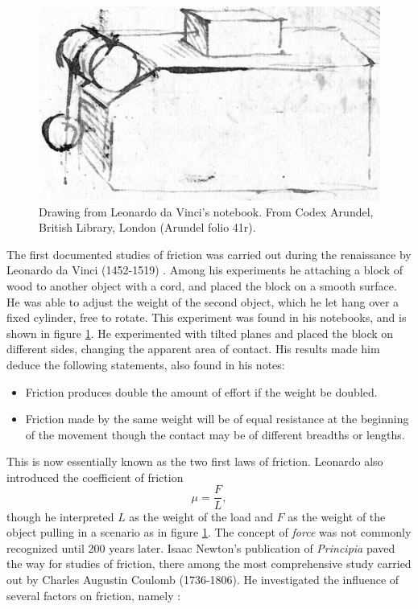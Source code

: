 \documentclass[twoside,english]{uiofysmaster}
\begin{document}
\begin{figure}[H]
	\centering
	\includegraphics[width=0.5\linewidth]{figures/friction/LeonardoDaVinciBW}
	\caption{Drawing from Leonardo da Vinci's notebook. From Codex Arundel, British Library, London (Arundel folio 41r).}
	\label{fig:leonardoDaVinci}
\end{figure}
\noindent 
The first documented studies of friction was carried out during the renaissance by Leonardo da Vinci (1452-1519) \cite{LeonardoDaVinciStudies}.
Among his experiments he attaching a block of wood to another object with a cord, and placed the block on a smooth surface.
He was able to adjust the weight of the second object, which he let hang over a fixed cylinder, free to rotate. 
This experiment was found in his notebooks, and is shown in figure \ref{fig:leonardoDaVinci}.
He experimented with tilted planes and placed the block on different sides, changing the apparent area of contact.
His results made him deduce the following statements, also found in his notes:
\begin{itemize}
	\item Friction produces double the amount of effort if the weight be doubled. 
	\item Friction made by the same weight will be of equal resistance at the beginning of the movement though the contact may be of different breadths or lengths.
\end{itemize}
This is now essentially known as the two first laws of friction. 
Leonardo also introduced the coefficient of friction 
\begin{equation}
	\mu = \frac{F}{L}, \label{eq:coefficientOfFriction}
\end{equation}
though he interpreted $L$ as the weight of the load and $F$ as the weight of the object pulling in a scenario as in figure \ref{fig:leonardoDaVinci}. The concept of \textit{force} was not commonly recognized until 200 years later. Isaac Newton's publication of \textit{Principia} paved the way for studies of friction, there among the most comprehensive study carried out by Charles Augustin Coulomb (1736-1806). He investigated the influence of several factors on friction, namely \cite{SlidingFriction}:
\end{document}
